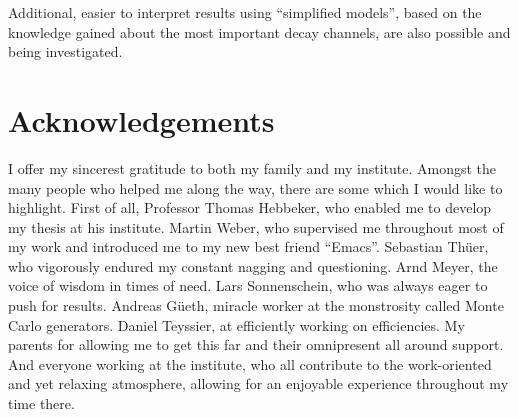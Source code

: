 Additional, easier to interpret results using ``simplified models'', based on the knowledge gained about the most important decay channels, are also possible and being investigated.

\section*{Acknowledgements} 
\label{sec:acknowledgements}

I offer my sincerest gratitude to both my family and my institute. Amongst the many people who helped me along the way, there are some which I would like to highlight. First of all, Professor Thomas Hebbeker, who enabled me to develop my thesis at his institute. Martin Weber, who supervised me throughout most of my work and introduced me to my new best friend ``Emacs''. Sebastian Th\"uer, who vigorously endured my constant nagging and questioning. Arnd Meyer, the voice of wisdom in times of need. Lars Sonnenschein, who was always eager to push for results. Andreas G\"ueth, miracle worker at the monstrosity called Monte Carlo generators. Daniel Teyssier, at efficiently working on efficiencies. My parents for allowing me to get this far and their omnipresent all around support. And everyone working at the institute, who all contribute to the work-oriented and yet relaxing atmosphere, allowing for an enjoyable experience throughout my time there.

